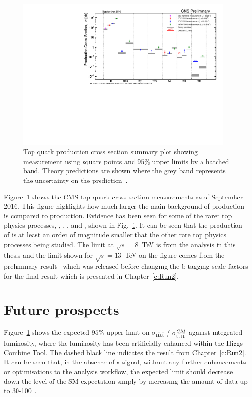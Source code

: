 \begin{figure}[ht!]
\begin{center}
    \includegraphics[width=0.97\textwidth]{images/Conclusion/ttplusx_staircase.pdf}
    \caption{Top quark production cross section summary plot showing measurement using square points and $95\%$ upper limits by a hatched band. Theory predictions are shown where the grey band represents the uncertainty on the prediction~\cite{topSumTwiki}.}
    \label{fig:ttbarXstairway}
\end{center}
\end{figure}

Figure~\ref{fig:ttbarXstairway} shows the CMS top quark cross section measurements as of September 2016. This figure highlights how much larger the main background of \ttbar production is compared to \tttt production.
Evidence has been seen for some of the rarer top physics processes, \ttbb, \ttgam, \ttW, \ttZ and \ttH, shown in Fig.~\ref{fig:ttbarXstairway}. It can be seen that the production of \tttt is at least an order of magnitude smaller that the other rare top physics processes being studied. The limit at $\sqrt{s}=8$~TeV is from the analysis in this thesis and the limit shown for $\sqrt{s}=13$~TeV on the figure comes from the preliminary result~\cite{CMS-PAS-TOP-16-016} which was released before changing the b-tagging scale factors for the final result which is presented in Chapter~\ref{c:Run2}.

\section{Future prospects}

Figure~\ref{fig:ttbarXstairway} shows the expected $95\%$ upper limit on $\sigma_{{\mathrm{t}\overline{\mathrm{t}}\mathrm{t}\overline{\mathrm{t}}}}~/~\sigma_{{\mathrm{t}\overline{\mathrm{t}}\mathrm{t}\overline{\mathrm{t}}}}^{SM} $ against integrated luminosity, where the luminosity has been artificially enhanced within the Higgs Combine Tool. The dashed black line indicates the \runtwo result from Chapter~\ref{c:Run2}. It can be seen that, in the absence of a signal, without any further enhancements or optimisations to the analysis workflow, the expected limit should decrease down the level of the SM expectation simply by increasing the amount of data up to 30-100~\fbinv.

